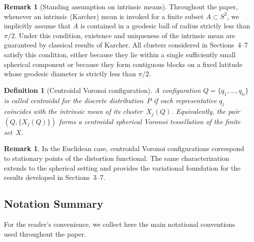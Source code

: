 \documentclass[12pt, reqno]{amsart}
\theoremstyle{plain}
\newtheorem{defi}[subsection]{Definition}
\theoremstyle{definition}
\newtheorem{remark}[subsection]{Remark}
\begin{document}
\begin{remark}[Standing assumption on intrinsic means]
Throughout the paper, whenever an intrinsic (Karcher) mean is invoked for a finite
subset $A\subset S^2$, we implicitly assume that $A$ is contained in a geodesic ball
of radius strictly less than $\pi/2$.
Under this condition, existence and uniqueness of the intrinsic mean are guaranteed
by classical results of Karcher.
All clusters considered in Sections~4--7 satisfy this condition, either because they
lie within a single sufficiently small spherical component or because they form
contiguous blocks on a fixed latitude whose geodesic diameter is strictly less than
$\pi/2$.
\end{remark} 
\begin{defi}[Centroidal Voronoi configuration]
A configuration $  Q=\{  q_{1},\dots ,   q_{n}\}$ is called
\emph{centroidal} for the discrete distribution~$P$
if each representative $  q_{j}$ coincides with the intrinsic mean of its
cluster~$  X_{j}(  Q)$.
Equivalently, the pair $(  Q,\{  X_{j}(  Q)\})$ forms a
\emph{centroidal spherical Voronoi tessellation} of the finite set~$X$.
\end{defi}

\begin{remark}
In the Euclidean case, centroidal Voronoi configurations correspond to stationary points
of the distortion functional.
The same characterization extends to the spherical setting and provides
the variational foundation for the results developed in Sections~3--7.
\end{remark}

\subsection{Notation Summary}

For the reader’s convenience, we collect here the main notational conventions
used throughout the paper.
\end{document}
